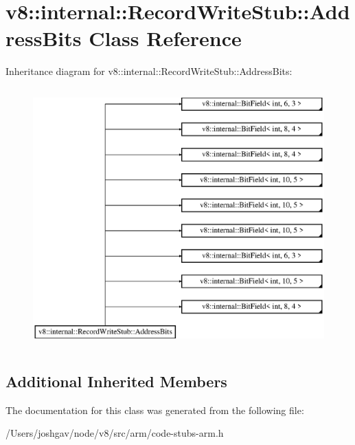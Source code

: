 \hypertarget{classv8_1_1internal_1_1_record_write_stub_1_1_address_bits}{}\section{v8\+:\+:internal\+:\+:Record\+Write\+Stub\+:\+:Address\+Bits Class Reference}
\label{classv8_1_1internal_1_1_record_write_stub_1_1_address_bits}
Inheritance diagram for v8\+:\+:internal\+:\+:Record\+Write\+Stub\+:\+:Address\+Bits\+:\begin{figure}[H]
\begin{center}
\leavevmode
\includegraphics[height=10.000000cm]{classv8_1_1internal_1_1_record_write_stub_1_1_address_bits}
\end{center}
\end{figure}
\subsection*{Additional Inherited Members}


The documentation for this class was generated from the following file\+:\begin{DoxyCompactItemize}
\item 
/\+Users/joshgav/node/v8/src/arm/code-\/stubs-\/arm.\+h\end{DoxyCompactItemize}
